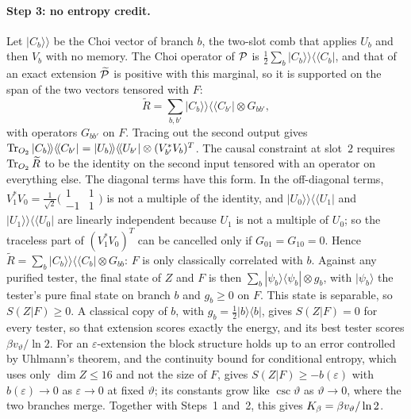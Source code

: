\paragraph{Step 3: no entropy credit.} Let $|C_b\rangle\!\rangle$ be the Choi vector of branch $b$, the two-slot comb that applies $U_b$ and then $V_b$ with no memory. The Choi operator of $\mathcal P$ is $\tfrac12\sum_b|C_b\rangle\!\rangle\langle\!\langle C_b|$, and that of an exact extension $\widetilde{\mathcal P}$ is positive with this marginal, so it is supported on the span of the two vectors tensored with $F$:
\[
\widetilde R=\sum_{b,b'}|C_b\rangle\!\rangle\langle\!\langle C_{b'}|\otimes G_{bb'},
\]
with operators $G_{bb'}$ on $F$. Tracing out the second output gives $\operatorname{Tr}_{O_2}|C_b\rangle\!\rangle\langle\!\langle C_{b'}|=|U_b\rangle\!\rangle\langle\!\langle U_{b'}|\otimes(V_{b'}^*V_b)^T$. The causal constraint at slot~$2$ requires $\operatorname{Tr}_{O_2}\widetilde R$ to be the identity on the second input tensored with an operator on everything else. The diagonal terms have this form. In the off-diagonal terms, $V_1^*V_0=\tfrac1{\sqrt2}\bigl(\begin{smallmatrix}1&1\\-1&1\end{smallmatrix}\bigr)$ is not a multiple of the identity, and $|U_0\rangle\!\rangle\langle\!\langle U_1|$ and $|U_1\rangle\!\rangle\langle\!\langle U_0|$ are linearly independent because $U_1$ is not a multiple of $U_0$; so the traceless part of $(V_1^*V_0)^T$ can be cancelled only if $G_{01}=G_{10}=0$. Hence $\widetilde R=\sum_b|C_b\rangle\!\rangle\langle\!\langle C_b|\otimes G_{bb}$: $F$ is only classically correlated with $b$. Against any purified tester, the final state of $Z$ and $F$ is then $\sum_b|\psi_b\rangle\langle\psi_b|\otimes g_b$, with $|\psi_b\rangle$ the tester's pure final state on branch $b$ and $g_b\ge0$ on $F$. This state is separable, so $S(Z|F)\ge0$. A classical copy of $b$, with $g_b=\tfrac12|b\rangle\langle b|$, gives $S(Z|F)=0$ for every tester, so that extension scores exactly the energy, and its best tester scores $\beta v_\vartheta/\ln2$. For an $\varepsilon$-extension the block structure holds up to an error controlled by Uhlmann's theorem, and the continuity bound for conditional entropy, which uses only $\dim Z\le16$ and not the size of $F$, gives $S(Z|F)\ge-b(\varepsilon)$ with $b(\varepsilon)\to0$ as $\varepsilon\to0$ at fixed $\vartheta$; its constants grow like $\csc\vartheta$ as $\vartheta\to0$, where the two branches merge. Together with Steps~1 and~2, this gives $K_\beta=\beta v_\vartheta/\ln2$.

